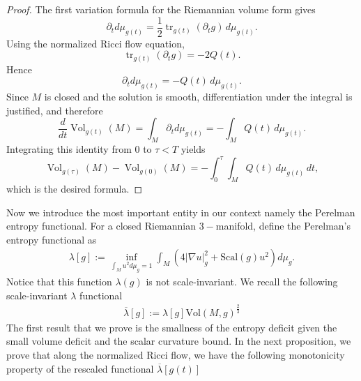 \documentclass{amsart}
\begin{document}
\begin{proof}
The first variation formula for the Riemannian volume form gives
\[
        \partial_t d\mu_{g(t)}
        =
        \frac12\operatorname{tr}_{g(t)}(\partial_t g)\,d\mu_{g(t)}.
\]
Using the normalized Ricci flow equation,
\[
        \operatorname{tr}_{g(t)}(\partial_t g)
       =
        -2Q(t).
\]
Hence
\[
        \partial_t d\mu_{g(t)}=-Q(t)\,d\mu_{g(t)}.
\]
Since \(M\) is closed and the solution is smooth, differentiation under the integral is justified, and therefore
\[
        \frac{d}{dt}\operatorname{Vol}_{g(t)}(M)
        =
        \int_M \partial_t d\mu_{g(t)}
        =
        -\int_M Q(t)\,d\mu_{g(t)}.
\]
Integrating this identity from \(0\) to \(\tau<T\) yields
\[
        \operatorname{Vol}_{g(\tau)}(M)-\operatorname{Vol}_{g(0)}(M)
        =
        -\int_0^\tau\int_M Q(t)\,d\mu_{g(t)}\,dt,
\]
which is the desired formula.
\end{proof}\noindent Now we introduce the most important entity in our context namely the Perelman entropy functional. For a closed Riemannian $3-$manifold, define the Perelman's entropy functional as 
\begin{eqnarray}
\lambda[g]:=\inf_{\int_{M}u^{2}d\mu_{g}=1}\int_{M}\left(4|\nabla u|^{2}_{g}+\text{Scal}(g)u^{2}\right)d\mu_{g}.    
\end{eqnarray}
Notice that this function $\lambda(g)$ is not scale-invariant. We recall the following scale-invariant $\lambda$ functional 
\begin{eqnarray}
\overline{\lambda}[g]:=\lambda[g]\text{Vol}(M,g)^{\frac{2}{3}}
\end{eqnarray}
The first result that we prove is the smallness of the entropy deficit given the small volume deficit and the scalar curvature bound.
\noindent In the next proposition, we prove that along the normalized Ricci flow, we have the following monotonicity property of the rescaled functional $\overline{\lambda}[g(t)]$
\end{document}
